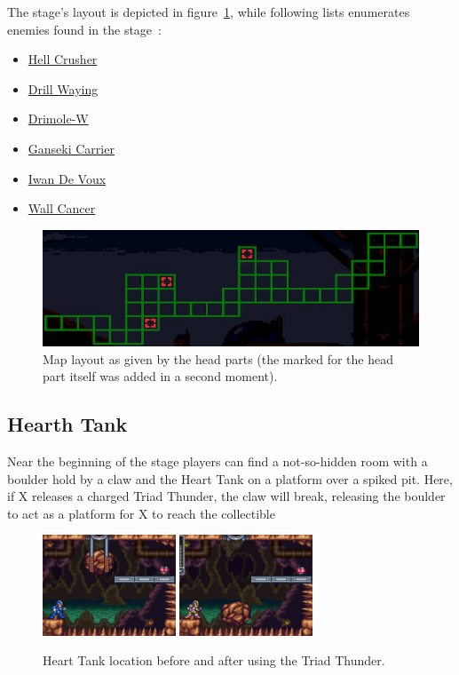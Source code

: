 The stage's layout is depicted in figure~\ref{fig:Quarry_map}, while following lists enumerates enemies found in the stage~\cite{wiki:Shipyard}:
\begin{itemize}
	\item \hyperlink{miniboss:Hell_Crusher}{Hell Crusher}
	\item \hyperlink{enem:Drill_Waying}{Drill Waying}
	\item \hyperlink{enem:Drimole-W}{Drimole-W}
	\item \hyperlink{enem:Ganseki_Carrier}{Ganseki Carrier}
	\item \hyperlink{enem:Iwan_De_Voux}{Iwan De Voux}
	\item \hyperlink{enem:Wall_Cancer}{Wall Cancer}
\end{itemize}

\begin{figure}[htp]
	\centering
	\includegraphics[width=.7\linewidth]{figures/X3/Tunnel_rhino/map.jpg}
	\caption{Map layout as given by the head parts (the marked for the head part itself was added in a second moment).}
	\label{fig:Quarry_map}
\end{figure}

\subsection{Hearth Tank}
Near the beginning of the stage players can find a not-so-hidden room with a boulder hold by a claw and the Heart Tank on a platform over a spiked pit. Here, if X releases a charged Triad Thunder, the claw will break, releasing the boulder to act as a platform for X to reach the collectible
\begin{figure}[htp]
	\centering
	\includegraphics[height=3cm]{figures/X3/Tunnel_rhino/heart_1.jpg}
	\includegraphics[height=3cm]{figures/X3/Tunnel_rhino/heart_2.jpg}
	\caption{Heart Tank location before and after using the Triad Thunder.}
\end{figure}


